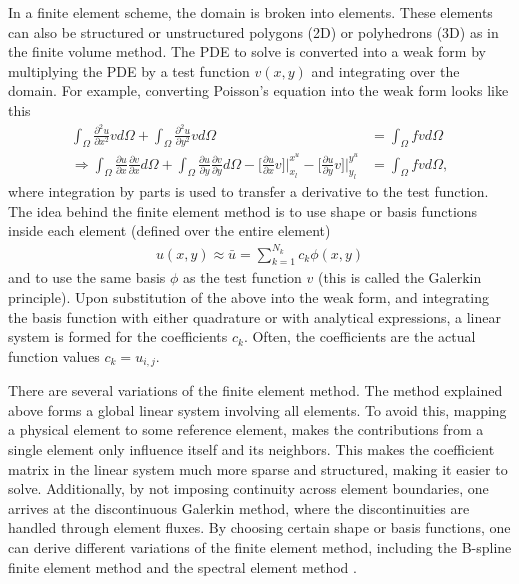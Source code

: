 In a finite element scheme, the domain is broken into elements. These elements can also be structured or unstructured polygons (2D) or polyhedrons (3D) as in the finite volume method. The PDE to solve is converted into a weak form by multiplying the PDE by a test function $v(x,y)$ and integrating over the domain. For example, converting Poisson's equation into the weak form looks like this
\begin{align}
    \int_{\Omega} \frac{\partial^2 u}{\partial x^2} v d\Omega + \int_{\Omega} \frac{\partial^2 u}{\partial y^2} v d\Omega &= \int_{\Omega} f v d\Omega \\
    \Rightarrow \int_{\Omega} \frac{\partial u}{\partial x} \frac{\partial v}{\partial x} d\Omega + \int_{\Omega} \frac{\partial u}{\partial y} \frac{\partial v}{\partial y} d\Omega - \Big[ \frac{\partial u}{\partial x} v \Big] \Big|_{x_l}^{x^u} - \Big[ \frac{\partial u}{\partial y} v \Big] \Big|_{y_l}^{y^u} &= \int_{\Omega} f v d\Omega,
\end{align}
where integration by parts is used to transfer a derivative to the test function. The idea behind the finite element method is to use shape or basis functions inside each element (defined over the entire element)
\begin{align}
    u(x,y) \approx \bar{u} = \sum_{k=1}^{N_k} c_k \phi(x,y)
\end{align}
and to use the same basis $\phi$ as the test function $v$ (this is called the Galerkin principle). Upon substitution of the above into the weak form, and integrating the basis function with either quadrature or with analytical expressions, a linear system is formed for the coefficients $c_k$. Often, the coefficients are the actual function values $c_k = u_{i,j}$.

There are several variations of the finite element method. The method explained above forms a global linear system involving all elements. To avoid this, mapping a physical element to some reference element, makes the contributions from a single element only influence itself and its neighbors. This makes the coefficient matrix in the linear system much more sparse and structured, making it easier to solve. Additionally, by not imposing continuity across element boundaries, one arrives at the discontinuous Galerkin method, where the discontinuities are handled through element fluxes. By choosing certain shape or basis functions, one can derive different variations of the finite element method, including the B-spline finite element method \cite{kagan1998new} and the spectral element method \cite{patera1984spectral}.

